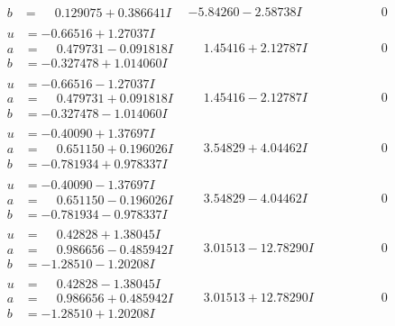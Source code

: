 \documentclass[1p]{elsarticle_modified}
\theoremstyle{definition}
\begin{document}
$$\begin{array}{c|c|c}
\begin{aligned}
b &= \phantom{-}0.129075 + 0.386641 I\end{aligned}
 & -5.84260 - 2.58738 I & \phantom{-0.000000 } 0 \\ \hline\begin{aligned}
u &= -0.66516 + 1.27037 I \\
a &= \phantom{-}0.479731 - 0.091818 I \\
b &= -0.327478 + 1.014060 I\end{aligned}
 & \phantom{-}1.45416 + 2.12787 I & \phantom{-0.000000 } 0 \\ \hline\begin{aligned}
u &= -0.66516 - 1.27037 I \\
a &= \phantom{-}0.479731 + 0.091818 I \\
b &= -0.327478 - 1.014060 I\end{aligned}
 & \phantom{-}1.45416 - 2.12787 I & \phantom{-0.000000 } 0 \\ \hline\begin{aligned}
u &= -0.40090 + 1.37697 I \\
a &= \phantom{-}0.651150 + 0.196026 I \\
b &= -0.781934 + 0.978337 I\end{aligned}
 & \phantom{-}3.54829 + 4.04462 I & \phantom{-0.000000 } 0 \\ \hline\begin{aligned}
u &= -0.40090 - 1.37697 I \\
a &= \phantom{-}0.651150 - 0.196026 I \\
b &= -0.781934 - 0.978337 I\end{aligned}
 & \phantom{-}3.54829 - 4.04462 I & \phantom{-0.000000 } 0 \\ \hline\begin{aligned}
u &= \phantom{-}0.42828 + 1.38045 I \\
a &= \phantom{-}0.986656 - 0.485942 I \\
b &= -1.28510 - 1.20208 I\end{aligned}
 & \phantom{-}3.01513 - 12.78290 I & \phantom{-0.000000 } 0 \\ \hline\begin{aligned}
u &= \phantom{-}0.42828 - 1.38045 I \\
a &= \phantom{-}0.986656 + 0.485942 I \\
b &= -1.28510 + 1.20208 I\end{aligned}
 & \phantom{-}3.01513 + 12.78290 I & \phantom{-0.000000 } 0 \\ \hline\begin{aligned}

\end{aligned}
\end{array}$$
\end{document}
